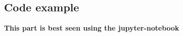 \documentclass[%
oneside,                 %
final,                   %
10pt]{article}
\begin{document}
\subsection{Code example}

\textbf{This part is best seen using the jupyter-notebook}
\end{document}
